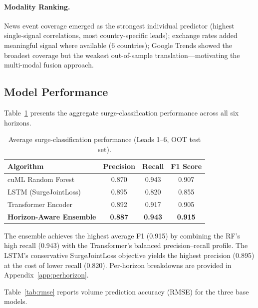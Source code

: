 \documentclass[11pt, a4paper]{article}
\begin{document}
\paragraph{Modality Ranking.}
News event coverage emerged as the strongest individual predictor (highest single-signal
correlations, most country-specific leads); exchange rates added meaningful signal where
available (6 countries); Google Trends showed the broadest coverage but the weakest
out-of-sample translation---motivating the multi-modal fusion approach.


\subsection{Model Performance}

Table~\ref{tab:summary_perf} presents the aggregate surge-classification performance
across all six horizons.

\begin{table}[ht]
  \centering
  \caption{Average surge-classification performance (Leads 1--6, OOT test set).}
  \label{tab:summary_perf}
  \begin{tabular}{l c c c}
    \toprule
    \textbf{Algorithm} & \textbf{Precision} & \textbf{Recall} & \textbf{F1 Score} \\
    \midrule
    cuML Random Forest              & 0.870 & 0.943 & 0.907 \\
    LSTM (SurgeJointLoss)           & 0.895 & 0.820 & 0.855 \\
    Transformer Encoder             & 0.892 & 0.917 & 0.905 \\
    \textbf{Horizon-Aware Ensemble} & \textbf{0.887} & \textbf{0.943} & \textbf{0.915} \\
    \bottomrule
  \end{tabular}
\end{table}

The ensemble achieves the highest average F1 (0.915) by combining the RF's high recall
(0.943) with the Transformer's balanced precision--recall profile.  The LSTM's
conservative SurgeJointLoss objective yields the highest precision (0.895) at the cost
of lower recall (0.820).  Per-horizon breakdowns are provided in
Appendix~\ref{app:perhorizon}.

\medskip

Table~\ref{tab:rmse} reports volume prediction accuracy (RMSE) for the three base
models.
\end{document}
